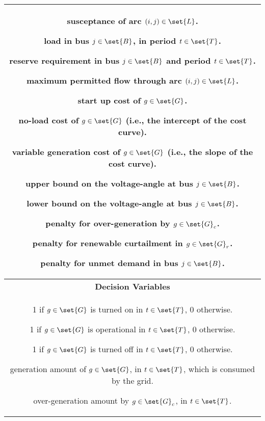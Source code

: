 \begin{table} [h]
\begin{tabular}{c}
\begin{minipage}{0.95\textwidth}
\begin{multicols}{2}
\begin{description}[labelwidth=\widthof{[$G^{\text{avail}}_{gt}$:]}]
\item[$B_{ij}$:] susceptance of arc $(i,j) \in \set{L}$.
\item[$D_{jt}$:] load in bus $j \in \set{B}$, in period $t \in \set{T}$.
\item[$R_{jt}$:] reserve requirement in bus $j \in \set{B}$ and period $t \in \set{T}$.
\item[$F_{ij}^{\max}$:] maximum permitted flow through arc $(i,j) \in \set{L}$.
\item[$c^{s}_g$:] start up cost of $g \in \set{G}$.
\item[$c^{f}_g$:] no-load cost of $g \in \set{G}$ (i.e., the intercept of the cost curve).
\item[$c^{p}_g$:] variable generation cost of $g \in \set{G}$ (i.e., the slope of the cost curve).
\item[$\theta^{\max}_j$:] upper bound on the voltage-angle at bus $j \in \set{B}$.
\item[$\theta^{\min}_j$:] lower bound on the voltage-angle at bus $j \in \set{B}$.
\item[$\phi^o_g$:] penalty for over-generation by $g \in \set{G}_c$.
\item[$\phi^c_g$:] penalty for renewable curtailment in $g \in \set{G}_r$.
\item[$\phi^u_j$:] penalty for unmet demand in bus $j \in \set{B}$. 
\end{description}
\end{multicols} 
\end{minipage} \smallskip \\ 
\midrule
\textbf{Decision Variables} \\ 
\midrule
\begin{minipage}{0.95\textwidth}
\begin{multicols}{2} 
\begin{description}[labelwidth=\widthof{$D^{\text{shed}}_{jt}$:}]
\item[$s_{gt}$:] 1 if $g \in \set{G}$ is turned on in $t \in \set{T}$, 0 otherwise.
\item[$x_{gt}$:] 1 if $g \in \set{G}$ is operational in $t \in \set{T}$, 0 otherwise.
\item[$z_{gt}$:] 1 if $g \in \set{G}$ is turned off in $t \in \set{T}$, 0 otherwise.
\item[$\usedgen_{gt}$:] generation amount of $g \in \set{G}$, in $t \in \set{T}$, which is consumed by the grid.
\item[$\overgen_{gt}$:] over-generation amount by $g \in \set{G}_c$, in $t \in \set{T}$.

\end{description}
\end{multicols}
\end{minipage}
\end{tabular}
\end{table}
